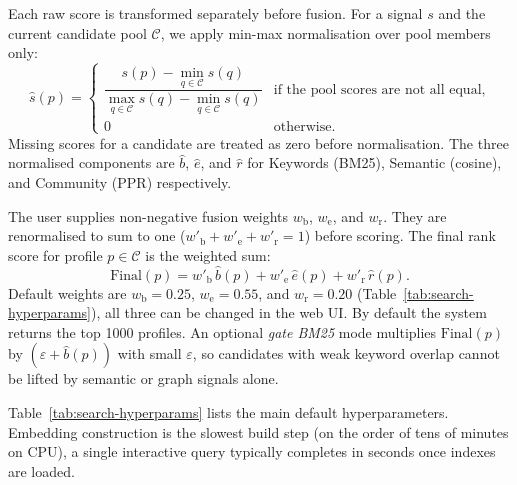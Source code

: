 \documentclass{article}
\begin{document}
Each raw score is transformed separately before fusion. For a signal $s$ and the current candidate pool $\mathcal{C}$, we apply min-max normalisation over pool members only:
\begin{equation}
  \widehat{s}(p) =
  \begin{cases}
    \dfrac{s(p) - \min_{q \in \mathcal{C}} s(q)}{\max_{q \in \mathcal{C}} s(q) - \min_{q \in \mathcal{C}} s(q)} & \text{if the pool scores are not all equal,}\\[0.6em]
    0 & \text{otherwise.}
  \end{cases}
  \label{eq:minmax}
\end{equation}
Missing scores for a candidate are treated as zero before normalisation. The three normalised components are $\widehat{b}$, $\widehat{e}$, and $\widehat{r}$ for Keywords (BM25), Semantic (cosine), and Community (PPR) respectively.

The user supplies non-negative fusion weights $w_{\mathrm{b}}$, $w_{\mathrm{e}}$, and $w_{\mathrm{r}}$. They are renormalised to sum to one ($w'_{\mathrm{b}} + w'_{\mathrm{e}} + w'_{\mathrm{r}} = 1$) before scoring. The final rank score for profile $p \in \mathcal{C}$ is the weighted sum:
\begin{equation}
  \mathrm{Final}(p) = w'_{\mathrm{b}}\,\widehat{b}(p) + w'_{\mathrm{e}}\,\widehat{e}(p) + w'_{\mathrm{r}}\,\widehat{r}(p).
  \label{eq:fusion}
\end{equation}
Default weights are $w_{\mathrm{b}} = 0.25$, $w_{\mathrm{e}} = 0.55$, and $w_{\mathrm{r}} = 0.20$ (Table~\ref{tab:search-hyperparams}), all three can be changed in the web UI. By default the system returns the top \num{1000} profiles. An optional \emph{gate BM25} mode multiplies $\mathrm{Final}(p)$ by $(\varepsilon + \widehat{b}(p))$ with small $\varepsilon$, so candidates with weak keyword overlap cannot be lifted by semantic or graph signals alone.


Table~\ref{tab:search-hyperparams} lists the main default hyperparameters. Embedding construction is the slowest build step (on the order of tens of minutes on CPU), a single interactive query typically completes in seconds once indexes are loaded.
\end{document}

